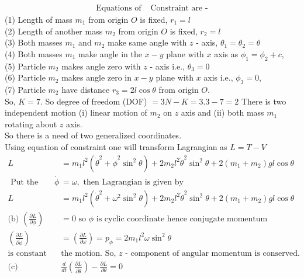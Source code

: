 \begin{enumerate}
\begin{answer}
\begin{align*}
		\text{Equations of }&\text{Constraint are -}
		\end{align*}
		(1) Length of mass $m_{1}$ from origin $O$ is fixed, $r_{1}=l$\\
		(2) Length of another mass $m_{2}$ from origin $O$ is fixed, $r_{2}=l$\\
		(3) Both masses $m_{1}$ and $m_{2}$ make same angle with $z$ - axis, $\theta_{1}=\theta_{2}=\theta$\\
		(4) Both masses $m_{1}$ make angle in the $x-y$ plane with $x$ axis as $\phi_{1}=\phi_{2}+c$,\\
		(5) Particle $m_{2}$ makes angle zero with $z$ - axis i.e., $\theta_{3}=0$\\
		(6) Particle $m_{2}$ makes angle zero in $x-y$ plane with $x$ axis i.e., $\phi_{3}=0$,\\
		(7) Particle $m_{2}$ have distance $r_{3}=2 l \cos \theta$ from origin $O$.\\
		So, $K=7$. So degree of freedom (DOF) $=3 N-K=3.3-7=2$
		There is two independent motion (i) linear motion of $m_{2}$ on $z$ axis and (ii) both mass $m_{1}$ rotating about $z$ axis.\\
		So there is a need of two generalized coordinates.\\
		Using equation of constraint one will transform Lagrangian as $L=T-V$
		\begin{align*}
		L&=m_{1} l^{2}\left(\dot{\theta}^{2}+\dot{\phi}^{2} \sin ^{2} \theta\right)+2 m_{2} l^{2} \dot{\theta}^{2} \sin ^{2} \theta+2\left(m_{1}+m_{2}\right) g l \cos \theta\\
		\text{	Put the value of }\dot{\phi}&=\omega,\text{ then Lagrangian is given by}\\
		L&=m_{1} l^{2}\left(\dot{\theta}^{2}+\omega^{2} \sin ^{2} \theta\right)+2 m_{2} l^{2} \dot{\theta}^{2} \sin ^{2} \theta+2\left(m_{1}+m_{2}\right) g l \cos \theta\\
		\text{(b) }\left(\frac{\partial L}{\partial \phi}\right)&=0\text{ so $\phi$ is cyclic coordinate hence conjugate momentum}\\ \left(\frac{\partial L}{\partial \dot{\phi}}\right)&=\left(\frac{\partial L}{\partial \omega}\right)=p_{\phi}=2 m_{1} l^{2} \omega \sin ^{2} \theta\\
		\text{is constant during  }&\text{the motion. So, $z$ - component of angular momentum is conserved.}\\
		\text{(c) }&\frac{d}{d t}\left(\frac{\partial L}{\partial \dot{\theta}}\right)-\frac{\partial L}{\partial \theta}=0\\

\end{align*}
\end{answer}
\end{enumerate}
